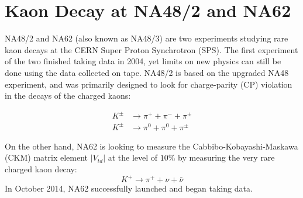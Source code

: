 \section{Kaon Decay at NA48/2 and NA62}
NA48/2 \cite{Batley:1999fv} and NA62 \cite{Martellotti:2015kna} (also known as NA48/3) are two experiments studying rare kaon decays at the CERN Super Proton Synchrotron (SPS).
The first experiment of the two finished taking data in 2004, yet limits on new physics can still be done using the data collected on tape.
NA48/2 is based on the upgraded NA48 experiment, and was primarily designed to look for charge-parity (CP) violation in the decays of the charged kaons:

\begin{align}
K^\pm & \rightarrow \pi^+ + \pi^- + \pi^\pm \\
K^\pm & \rightarrow \pi^0 + \pi^0 + \pi^\pm
\end{align}

On the other hand, NA62 is looking to measure the Cabbibo-Kobayashi-Maskawa (CKM) matrix element $|V_{td}|$ at the level of $10\%$ by measuring the very rare charged kaon decay:
\begin{equation}
K^+ \rightarrow \pi^+ + \nu + \bar{\nu}
\end{equation}
In October 2014, NA62 successfully launched and began taking data.
